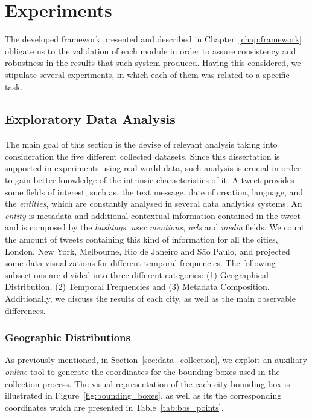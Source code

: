 \chapter{Experiments} \label{chap:experiments}

\minitoc \mtcskip \noindent

The developed framework presented and described in Chapter~\ref{chap:framework} obligate us to the validation of each module in order to assure consistency and robustness in the results that such system produced. Having this considered, we stipulate several experiments, in which each of them was related to a specific task. 

\section{Exploratory Data Analysis}\label{sec:exploratory_data_analysis}

The main goal of this section is the devise of relevant analysis taking into consideration the five different collected datasets. Since this dissertation is supported in experiments using real-world data, such analysis is crucial in order to gain better knowledge of the intrinsic characteristics of it. A tweet provides some fields of interest, such as, the text message, date of creation, language, and the \emph{entities}, which are constantly analysed in several data analytics systems. An \emph{entity} is metadata and additional contextual information contained in the tweet and is composed by the \emph{hashtags}, \emph{user mentions}, \emph{urls} and \emph{media} fields. We count the amount of tweets containing this kind of information for all the cities, London, New York, Melbourne, Rio de Janeiro and São Paulo, and projected some data visualizations for different temporal frequencies. The following subsections are divided into three different categories:  (1) Geographical Distribution, (2) Temporal Frequencies and (3) Metadata Composition. Additionally, we discuss the results of each city, as well as the main observable differences.

\subsection{Geographic Distributions}

As previously mentioned, in Section~\ref{sec:data_collection}, we exploit an auxiliary \textit{online} tool to generate the coordinates for the bounding-boxes used in the collection process. The visual representation of the each city bounding-box is illustrated in Figure~\ref{fig:bounding_boxes}, as well as its the corresponding coordinates which are presented in Table~\ref{tab:bbs_points}.

